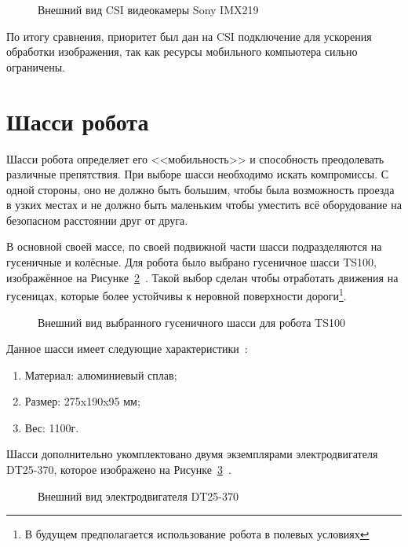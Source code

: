 \begin{figure}[ht]
    \caption{Внешний вид CSI видеокамеры Sony IMX219}\label{fig:csi-camera}
\end{figure}

По итогу сравнения, приоритет был дан на CSI подключение для ускорения обработки изображения, так как ресурсы мобильного компьютера сильно ограничены.

\section{Шасси робота}
Шасси робота определяет его <<мобильность>> и способность преодолевать различные препятствия. При выборе шасси необходимо искать компромиссы. С одной стороны, оно не должно быть большим, чтобы была возможность проезда в узких местах и не должно быть маленьким чтобы уместить всё оборудование на безопасном расстоянии друг от друга. 

В основной своей массе, по своей подвижной части шасси подразделяются на гусеничные и колёсные. Для робота было выбрано гусеничное шасси TS100, изображённое на Рисунке~\cref{fig:chassis}~\cite{chassis}. Такой выбор сделан чтобы отработать движения на гусеницах, которые более устойчивы к неровной поверхности дороги\footnote{В будущем предполагается использование робота в полевых условиях}.

\begin{figure}[ht]
    \caption{Внешний вид выбранного гусеничного шасси для робота TS100}\label{fig:chassis}
\end{figure}

Данное шасси имеет следующие характеристики~\cite{chassis}:
\begin{enumerate}[beginpenalty=10000] %
  \item Материал: алюминиевый сплав;
  \item Размер: 275x190x95 мм;
  \item Вес: 1100г.
\end{enumerate}

Шасси дополнительно укомплектовано двумя экземплярами электродвигателя DT25-370, которое изображено на Рисунке~\cref{fig:motor}~\cite{motor}.

\begin{figure}[ht]
    \caption{Внешний вид электродвигателя DT25-370}\label{fig:motor}
\end{figure}

